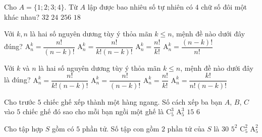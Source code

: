 \begin{ex}%
	Cho $A=\{1;2;3;4\}$. Từ $A$ lập được bao nhiêu số tự nhiên có $4$ chữ số đôi một khác nhau?  
	\choice
	{$32$}
	{\True $24$}
	{$256$}
	{$18$}
\end{ex}%
\begin{ex}%
	Với $k,n$ là hai số nguyên dương tùy ý thỏa mãn $k\leqslant n$, mệnh đề nào dưới đây đúng?
	\choice
	{\True $\mathrm{A}_n^k=\dfrac{n!}{(n-k)!}$}
	{$\mathrm{A}_n^k=\dfrac{n!}{k!(n-k)!}$}
	{$\mathrm{A}_n^k=\dfrac{n!}{k!}$}
	{$\mathrm{A}_n^k=\dfrac{(n-k)!}{n!}$}
\end{ex}%
\begin{ex}%
	Với $k$ và $n$ là hai số nguyên dương tùy ý thỏa mãn $k\le n$, mệnh đề nào dưới đây là đúng?
	\choice
	{$\mathrm{A}_n^k = \dfrac{n!}{k!(n-k)!}$}
	{\True $\mathrm{A}_n^k = \dfrac{n!}{(n-k)!}$}
	{$\mathrm{A}_n^k = \dfrac{n!}{k!}$}
	{$\mathrm{A}_n^k = \dfrac{k!}{n! (n-k)!}$}
\end{ex}%
\begin{ex}%
	Cho trước $5$ chiếc ghế xếp thành một hàng ngang. Số cách xếp ba bạn $A$, $B$, $C$ vào $5$ chiếc ghế đó sao cho mỗi bạn ngồi một ghế là
	\choice
	{$\mathrm{C}_5^3$}
	{\True $\mathrm{A}_5^3$}
	{$15$}
	{$6$}
\end{ex}%
\begin{ex}%
Cho tập hợp $S$ gồm có $5$ phần tử. Số tập con gồm $2$ phần tử của $S$ là
\choice
{$30$}
{$5^2$}
{\True $\mathrm{C}_5^2$}
{$\mathrm{A}_5^2$}
\end{ex}%

